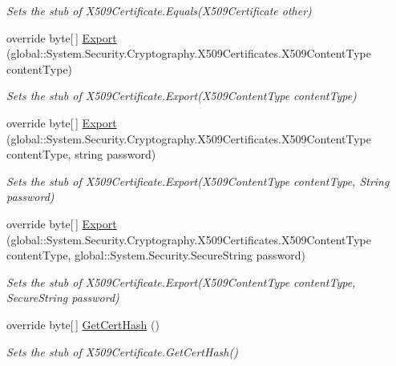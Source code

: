 \begin{DoxyCompactItemize}
\begin{DoxyCompactList}\small\item\em Sets the stub of X509\-Certificate.\-Equals(\-X509\-Certificate other)\end{DoxyCompactList}\item 
override byte\mbox{[}$\,$\mbox{]} \hyperlink{class_system_1_1_security_1_1_cryptography_1_1_x509_certificates_1_1_fakes_1_1_stub_x509_certificate_af95b20e61e0dfdaaa7475fde254bc510}{Export} (global\-::\-System.\-Security.\-Cryptography.\-X509\-Certificates.\-X509\-Content\-Type content\-Type)
\begin{DoxyCompactList}\small\item\em Sets the stub of X509\-Certificate.\-Export(\-X509\-Content\-Type content\-Type)\end{DoxyCompactList}\item 
override byte\mbox{[}$\,$\mbox{]} \hyperlink{class_system_1_1_security_1_1_cryptography_1_1_x509_certificates_1_1_fakes_1_1_stub_x509_certificate_a01c6b7142c6d1cb29711697be532dd84}{Export} (global\-::\-System.\-Security.\-Cryptography.\-X509\-Certificates.\-X509\-Content\-Type content\-Type, string password)
\begin{DoxyCompactList}\small\item\em Sets the stub of X509\-Certificate.\-Export(\-X509\-Content\-Type content\-Type, String password)\end{DoxyCompactList}\item 
override byte\mbox{[}$\,$\mbox{]} \hyperlink{class_system_1_1_security_1_1_cryptography_1_1_x509_certificates_1_1_fakes_1_1_stub_x509_certificate_adb2998a83823b686525faaf5cbf956a2}{Export} (global\-::\-System.\-Security.\-Cryptography.\-X509\-Certificates.\-X509\-Content\-Type content\-Type, global\-::\-System.\-Security.\-Secure\-String password)
\begin{DoxyCompactList}\small\item\em Sets the stub of X509\-Certificate.\-Export(\-X509\-Content\-Type content\-Type, Secure\-String password)\end{DoxyCompactList}\item 
override byte\mbox{[}$\,$\mbox{]} \hyperlink{class_system_1_1_security_1_1_cryptography_1_1_x509_certificates_1_1_fakes_1_1_stub_x509_certificate_a2ceed5b7e11a7acea51365f398f6644e}{Get\-Cert\-Hash} ()
\begin{DoxyCompactList}\small\item\em Sets the stub of X509\-Certificate.\-Get\-Cert\-Hash()\end{DoxyCompactList}\item 

\end{DoxyCompactItemize}
